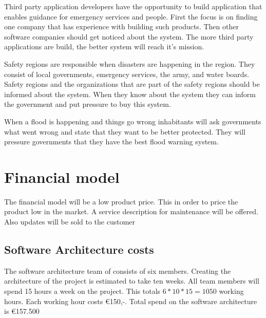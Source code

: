 Third party application developers have the opportunity to build application that enables guidance for emergency services and people. First the focus is on finding one company that has experience with building such products. Then other software companies should get noticed about the system. The more third party applications are build, the better system will reach it's mission.

Safety regions are responsible when disasters are happening in the region. They consist of local governments, emergency services, the army, and water boards. Safety regions and the organizations that are part of the safety regions should be informed about the system. When they know about the system they can inform the government and put pressure to buy this system.

When a flood is happening and things go wrong inhabitants will ask governments what went wrong and state that they want to be better protected. They will pressure governments that they have the best flood warning system.

\section{Financial model}
The financial model will be a low product price. This in order to price the product low in the market. A service description for maintenance will be offered. Also updates will be sold to the customer\\
\subsection{Software Architecture costs}
The software architecture team of \CompanyName consists of six members. Creating the architecture of the project is estimated to take ten weeks. All team members will spend 15 hours a week on the project. This totals $6*10*15=1050$ working hours. Each working hour costs \euro{}150,-. Total spend on the software architecture is \euro{}157.500
